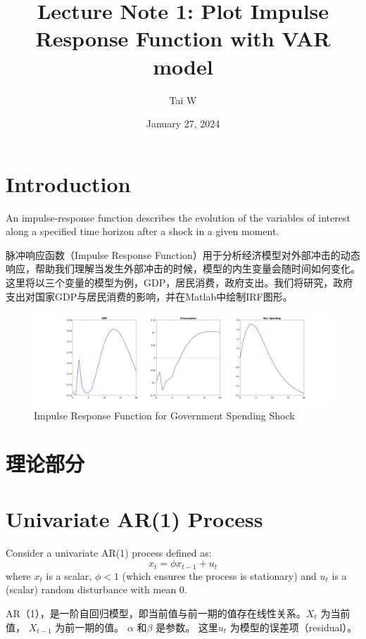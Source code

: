 \documentclass{article}
\title{\vspace{-2cm}\Large Lecture Note 1: Plot Impulse Response Function with VAR model}
\author{Tai W}
\date{January 27, 2024}
\begin{document}
\begin{CJK}{UTF8}{gbsn}

\maketitle
\section*{Introduction}

An impulse-response function describes the evolution of the variables of interest along a specified time horizon after a shock in a given moment.

脉冲响应函数（Impulse Response Function）用于分析经济模型对外部冲击的动态响应，帮助我们理解当发生外部冲击的时候，模型的内生变量会随时间如何变化。这里将以三个变量的模型为例，GDP，居民消费，政府支出。我们将研究，政府支出对国家GDP与居民消费的影响，并在Matlab中绘制IRF图形。

\begin{figure}[!h]
    \centering
    \includegraphics[width=1\linewidth]{Qb_1.jpg}
    \caption{Impulse Response Function for Government Spending Shock}
    \label{fig:enter-label}
\end{figure}

\section*{理论部分}
\section*{Univariate AR(1) Process}

Consider a univariate AR(1) process defined as:
\begin{equation}
    x_t = \phi x_{t-1} + u_t
\end{equation}
where $x_t$ is a scalar, $\phi < 1$ (which ensures the process is stationary) and $u_t$ is a (scalar) random disturbance with mean 0.

AR（1），是一阶自回归模型，即当前值与前一期的值存在线性关系。\( X_t\) 为当前值， \( X_{t-1}\) 为前一期的值。 \( \alpha \) 和\(\beta\) 是参数。 这里\(u_t\) 为模型的误差项（residual）。 


\end{CJK}
\end{document}

